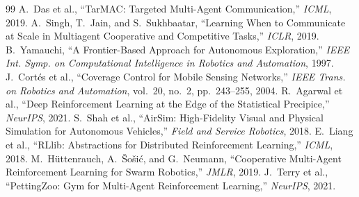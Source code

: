 \documentclass[twocolumn,10pt]{article}
\begin{document}
\begin{thebibliography}{99}
 A.~Das et al., ``TarMAC: Targeted Multi-Agent Communication,'' \emph{ICML}, 2019.
 A.~Singh, T.~Jain, and S.~Sukhbaatar, ``Learning When to Communicate at Scale in Multiagent Cooperative and Competitive Tasks,'' \emph{ICLR}, 2019.
 B.~Yamauchi, ``A Frontier-Based Approach for Autonomous Exploration,'' \emph{IEEE Int. Symp. on Computational Intelligence in Robotics and Automation}, 1997.
 J.~Cort\'es et al., ``Coverage Control for Mobile Sensing Networks,'' \emph{IEEE Trans. on Robotics and Automation}, vol.~20, no.~2, pp.~243--255, 2004.
 R.~Agarwal et al., ``Deep Reinforcement Learning at the Edge of the Statistical Precipice,'' \emph{NeurIPS}, 2021.
 S.~Shah et al., ``AirSim: High-Fidelity Visual and Physical Simulation for Autonomous Vehicles,'' \emph{Field and Service Robotics}, 2018.
 E.~Liang et al., ``RLlib: Abstractions for Distributed Reinforcement Learning,'' \emph{ICML}, 2018.
 M.~H\"uttenrauch, A.~\v{S}o\v{s}i\'c, and G.~Neumann, ``Cooperative Multi-Agent Reinforcement Learning for Swarm Robotics,'' \emph{JMLR}, 2019.
 J.~Terry et al., ``PettingZoo: Gym for Multi-Agent Reinforcement Learning,'' \emph{NeurIPS}, 2021.
\end{thebibliography}
\end{document}
